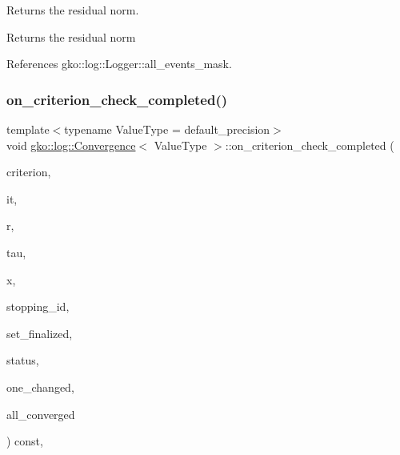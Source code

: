 Returns the residual norm. 

\begin{DoxyReturn}{Returns}
the residual norm 
\end{DoxyReturn}


References gko\+::log\+::\+Logger\+::all\+\_\+events\+\_\+mask.

\mbox{\label{classgko_1_1log_1_1Convergence_ae20904a348216c22750c266372b07b6e}} 
\subsubsection{\texorpdfstring{on\+\_\+criterion\+\_\+check\+\_\+completed()}{on\_criterion\_check\_completed()}}
{\footnotesize\ttfamily template$<$typename Value\+Type  = default\+\_\+precision$>$ \\
void \hyperlink{classgko_1_1log_1_1Convergence}{gko\+::log\+::\+Convergence}$<$ Value\+Type $>$\+::on\+\_\+criterion\+\_\+check\+\_\+completed (\begin{DoxyParamCaption}\item[{const \hyperlink{classgko_1_1stop_1_1Criterion}{stop\+::\+Criterion} $\ast$}]{criterion,  }\item[{const \hyperlink{namespacegko_a6e5c95df0ae4e47aab2f604a22d98ee7}{size\+\_\+type} \&}]{it,  }\item[{const \hyperlink{classgko_1_1LinOp}{Lin\+Op} $\ast$}]{r,  }\item[{const \hyperlink{classgko_1_1LinOp}{Lin\+Op} $\ast$}]{tau,  }\item[{const \hyperlink{classgko_1_1LinOp}{Lin\+Op} $\ast$}]{x,  }\item[{const \hyperlink{namespacegko_a3950fc3732811a8563484e5098c31531}{uint8} \&}]{stopping\+\_\+id,  }\item[{const bool \&}]{set\+\_\+finalized,  }\item[{const \hyperlink{classgko_1_1Array}{Array}$<$ \hyperlink{classgko_1_1stopping__status}{stopping\+\_\+status} $>$ $\ast$}]{status,  }\item[{const bool \&}]{one\+\_\+changed,  }\item[{const bool \&}]{all\+\_\+converged }\end{DoxyParamCaption}) const\hspace{0.3cm}{\ttfamily [override]}, {\ttfamily [virtual]}}




